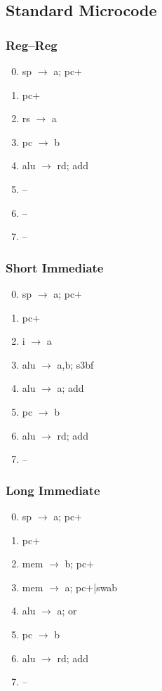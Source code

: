 \documentclass[11pt]{book}
\begin{document}
\subsection*{Standard Microcode}
\begin{multicols}{3}\ttfamily\selectfont\small
  \subsubsection*{Reg--Reg}
  \begin{enumerate}\setcounter{enumi}{-1}
  \item sp \(\rightarrow\) a; pc\(+\)
  \item pc\(+\)
  \item rs \(\rightarrow\) a
  \item pc \(\rightarrow\) b
  \item alu \(\rightarrow\) rd; add
  \item --
  \item --
  \item --
  \end{enumerate}
  \columnbreak
  \subsubsection*{Short Immediate}
  \begin{enumerate}\setcounter{enumi}{-1}
  \item sp \(\rightarrow\) a; pc\(+\)
  \item pc\(+\)
  \item i \(\rightarrow\) a
  \item alu \(\rightarrow\) a,b; s3bf
  \item alu \(\rightarrow\) a; add
  \item pc \(\rightarrow\) b
  \item alu \(\rightarrow\) rd; add
  \item --
  \end{enumerate}
  \columnbreak
  \subsubsection*{Long Immediate}
  \begin{enumerate}\setcounter{enumi}{-1}
  \item sp \(\rightarrow\) a; pc\(+\)
  \item pc\(+\)
  \item mem \(\rightarrow\) b; pc\(+\)
  \item mem \(\rightarrow\) a; pc\(+\)|swab
  \item alu \(\rightarrow\) a; or
  \item pc \(\rightarrow\) b
  \item alu \(\rightarrow\) rd; add
  \item --
  \end{enumerate}
\end{multicols}
\end{document}
